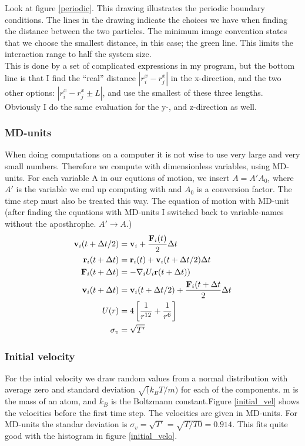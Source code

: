 Look at figure \ref{periodic}. This drawing illustrates the periodic boundary conditions. The lines in the drawing indicate the choices we have when finding the distance between the two particles. The minimum image convention states that we
choose the smallest distance, in this case; the green line. This limits the interaction range to half the system size.\\
This is done by a set of complicated expressions in my program, but the bottom line is that I find the ``real'' distance $|r_i^x -r_j^x|$ in the x-direction, and the two other options: $|r_i^x - r_j^x \pm L|$, and use the smallest of these three lengths. 
Obviously I do the same evaluation for the y-, and z-direction as well. 

\subsubsection{MD-units}
When doing computations on a computer it is not wise to use very large and very small numbers. Therefore we compute with dimensionless variables, using MD-units. For each variable A in our equtions of motion, we insert $A = A'A_0$, where $A'$
is the variable we end up computing with and $A_0$ is a conversion factor. The time step must also be treated this way. The equation of motion with MD-unit (after finding the equations with MD-units I switched back to variable-names without the aposthrophe. $A'\rightarrow A$.)
\begin{align}
 {\bf v}_i(t + \Delta t/2) &= {\bf v}_i + \frac{{\bf F}_i(t)}{2}\Delta t\nonumber\\
 {\bf r}_i(t + \Delta t) &= {\bf r}_i(t) + {\bf v}_i(t + \Delta t/2)\Delta t\nonumber\\
 {\bf F}_i(t + \Delta t) &= -\nabla_i U_i{\bf r}(t+\Delta t))\nonumber\\
 {\bf v}_i(t + \Delta t) &= {\bf v}_i(t+ \Delta t/2) + \frac{{\bf F}_i(t+\Delta t}{2}\Delta t\nonumber\\
 U(r) &= 4\left[\frac{1}{r^{12}} + \frac{1}{r^6}\right]\nonumber\\
 \sigma_v &= \sqrt{T'}
\end{align}

\subsubsection{Initial velocity}
For the intial velocity we draw random values from a normal distribution with average zero and standard deviation $\sqrt(k_B T/m)$ for each of the components. m is the mass of an atom, and $k_B$ is the Boltzmann constant.Figure \ref{initial_vel} shows the velocities 
before the first time step. The velocities are given in MD-units. For MD-units the standar deviation is $\sigma_v = \sqrt{T'} = \sqrt{T/T0} = 0.914$. This fits quite good with the histogram in figure \ref{initial_velo}.

